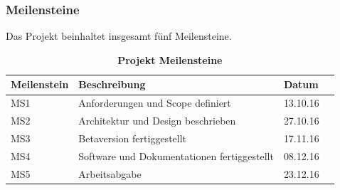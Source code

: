 \documentclass[a4,12pt]{scrartcl}
\begin{document}
\subsubsection{Meilensteine}
Das Projekt beinhaltet insgesamt fünf Meilensteine. \\
\begin{table}[H]
    \begin{tabular}{@{} l l l r@{}}\toprule    
    {Meilenstein} & {Beschreibung} & {Datum}\\ \midrule
    MS1 & Anforderungen und Scope definiert  & 13.10.16\\ \addlinespace
    MS2 & Architektur und Design beschrieben & 27.10.16\\ \addlinespace
    MS3 & Betaversion fertiggestellt  & 17.11.16\\ \addlinespace
    MS4 & Software und Dokumentationen fertiggestellt  & 08.12.16\\ \addlinespace
    MS5 & Arbeitsabgabe & 23.12.16\\ 
    \bottomrule
    \end{tabular}
\caption{\textbf{Projekt Meilensteine}}
\end{table}
\end{document}
